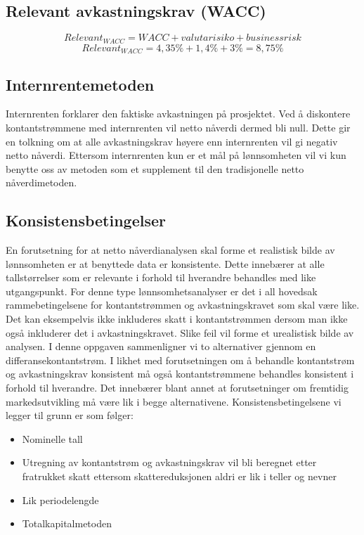 \subsection{Relevant avkastningskrav (WACC)}
\[Relevant_{WACC} = WACC + valutarisiko + business risk\]
\[Relevant_{WACC} = 4,35\% + 1,4\% + 3\% = 8,75\%\]

\subsection{Internrentemetoden}
Internrenten forklarer den faktiske avkastningen på prosjektet. Ved å diskontere kontantstrømmene med internrenten vil netto nåverdi dermed bli null. Dette gir en tolkning om at alle avkastningskrav høyere enn internrenten vil gi negativ netto nåverdi. Ettersom internrenten kun er et mål på lønnsomheten vil vi kun benytte oss av metoden som et supplement til den tradisjonelle netto nåverdimetoden.

\subsection{Konsistensbetingelser}
En forutsetning for at netto nåverdianalysen skal forme et realistisk bilde av lønnsomheten er at benyttede data er konsistente. Dette innebærer at alle tallstørrelser som er relevante i forhold til hverandre behandles med like utgangspunkt. For denne type lønnsomhetsanalyser er det i all hovedsak rammebetingelsene for kontantstrømmen og avkastningskravet som skal være like. Det kan eksempelvis ikke inkluderes skatt i kontantstrømmen dersom man ikke også inkluderer det i avkastningskravet. Slike feil vil forme et urealistisk bilde av analysen. I denne oppgaven sammenligner vi to alternativer gjennom en differansekontantstrøm. I likhet med forutsetningen om å behandle kontantstrøm og avkastningskrav konsistent må også kontantstrømmene behandles konsistent i forhold til hverandre. Det innebærer blant annet at forutsetninger om fremtidig markedsutvikling må være lik i begge alternativene. Konsistensbetingelsene vi legger til grunn er som følger:

\begin{itemize}
\item Nominelle tall
\item Utregning av kontantstrøm og avkastningskrav vil bli beregnet etter fratrukket skatt ettersom skattereduksjonen aldri er lik i teller og nevner
\item Lik periodelengde
\item Totalkapitalmetoden
\end{itemize}

